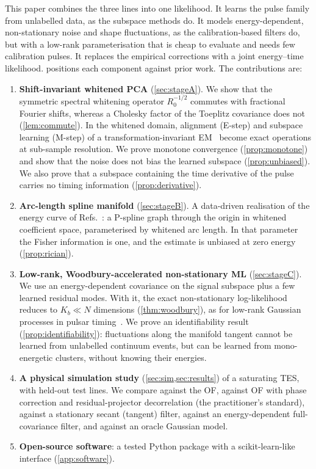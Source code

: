 \documentclass[aps,prapplied,reprint,superscriptaddress,longbibliography,nofootinbib]{revtex4-2}
\theoremstyle{remark}
\begin{document}
This paper combines the three lines into one likelihood. It learns the pulse family
from unlabelled data, as the subspace methods do. It models energy-dependent,
non-stationary noise and shape fluctuations, as the calibration-based filters do,
but with a low-rank parameterisation that is cheap to evaluate and needs few
calibration pulses. It replaces the empirical corrections with a joint
energy--time likelihood.  positions each component against
prior work. The contributions are:
\begin{enumerate}
\item \textbf{Shift-invariant whitened PCA} (\cref{sec:stageA}). We show that the
symmetric spectral whitening operator $R_0^{-1/2}$ commutes with fractional Fourier
shifts, whereas a Cholesky factor of the Toeplitz covariance does not
(\cref{lem:commute}). In the whitened domain, alignment (E-step) and subspace
learning (M-step) of a transformation-invariant EM~\cite{FreyJojic2003} become
exact operations at sub-sample resolution. We prove monotone convergence
(\cref{prop:monotone}) and show that the noise does not bias the learned subspace
(\cref{prop:unbiased}). We also prove that a subspace containing the time
derivative of the pulse carries no timing information (\cref{prop:derivative}).
\item \textbf{Arc-length spline manifold} (\cref{sec:stageB}). A data-driven
realisation of the energy curve of
Refs.~\cite{Fixsen2014,Fowler2017tangent,Fowler2018nonlinear}: a P-spline graph
through the origin in whitened coefficient space, parameterised by whitened arc
length. In that parameter the Fisher information is one, and the estimate is
unbiased at zero energy (\cref{prop:rician}).
\item \textbf{Low-rank, Woodbury-accelerated non-stationary ML} (\cref{sec:stageC}).
We use an energy-dependent covariance on the signal subspace plus a few
learned residual modes. With it, the exact non-stationary log-likelihood reduces to
$K_b\ll N$ dimensions (\cref{thm:woodbury}), as for low-rank Gaussian processes in
pulsar timing~\cite{vanHaasteren2014,Lentati2017}. We prove an identifiability
result (\cref{prop:identifiability}): fluctuations along the manifold tangent
cannot be learned from unlabelled continuum events, but can be learned from
mono-energetic clusters, without knowing their energies.
\item \textbf{A physical simulation study} (\cref{sec:sim,sec:results}) of a
saturating TES, with held-out test lines. We compare against the OF, against OF
with phase correction and residual-projector decorrelation (the practitioner's
standard), against a stationary secant (tangent) filter, against an
energy-dependent full-covariance filter, and against an oracle Gaussian model.
\item \textbf{Open-source software}: a tested Python package with a
scikit-learn-like interface (\cref{app:software}).
\end{enumerate}
\end{document}
